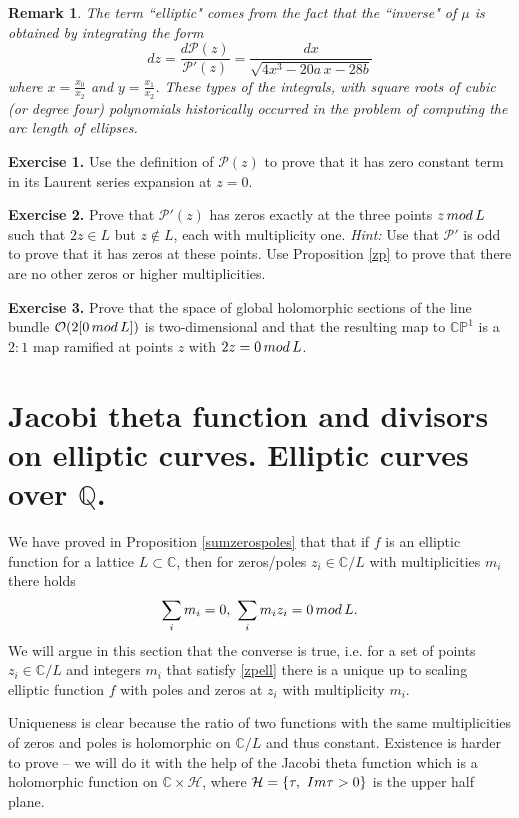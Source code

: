 \documentclass[11pt]{article}
\numberwithin{equation}{section}
\numberwithin{footnote}{section}
\newtheorem{rem}[thm]{Remark}
\newcommand{\blue}{\color{blue}}
\renewcommand{\P}{{\mathbb P}}
\newcommand{\Q}{{\mathbb Q}}
\newcommand{\C}{{\mathbb C}}
\begin{document}
\smallskip
\begin{rem}
The term ``elliptic" comes from the fact that the ``inverse" of $\mu$ is obtained by integrating the form 
$$
dz = \frac  {d\mathcal P(z)}{\mathcal P'(z)} = \frac {dx}{\sqrt{4x^3-20a\,x-28b}}
$$ 
where $x=\frac {x_0}{x_2}$ and $y=\frac{x_1}{x_2}$. These types of the integrals, with square roots of cubic (or degree four) polynomials historically occurred in the problem of computing the arc length of ellipses.
\end{rem}

\smallskip


{\bf Exercise 1.} Use the definition of $\mathcal P(z)$ to prove that it has zero constant term in its Laurent series expansion at $z=0$.

{\bf Exercise 2.} Prove that $\mathcal P'(z)$ has zeros exactly at the three points $z\,{\rm mod}\,L$ such that $2z\in L$ but $z\not\in L$, each with multiplicity one. \emph{Hint:} Use that $\mathcal P'$ is odd to prove that it has zeros at these points. Use Proposition \ref{zp} to prove that there are no other zeros or higher multiplicities.

{\bf Exercise 3.} Prove that the space of global holomorphic sections of the line bundle $\mathcal O(2[0\,{\rm mod}\,L])$  is two-dimensional and that the resulting map to $\C\P^1$ is a $2:1$ map ramified at points $z$ with $2z= 0\,{\rm mod}\, L$.


\section{Jacobi theta function and divisors on elliptic curves. Elliptic curves over $\Q$.}
We have proved in Proposition \ref{sumzerospoles} that that if $f$ is an elliptic function for a lattice $L\subset \C$, then for zeros/poles $z_i\in \C/L$ with multiplicities $m_i$ there holds 
\begin{equation}\label{zpell}
\sum_{i}m_i = 0,~\sum_i m_i z_i =0\,{\rm mod}\,L.
\end{equation}
We will argue in this section that the converse is true, i.e. for a set of points $z_i\in \C/L$ and integers $m_i$ that satisfy \eqref{zpell} there is a unique up to scaling elliptic function $f$ with poles and zeros at $z_i$ with multiplicity $m_i$.

\smallskip
Uniqueness is clear because the ratio of two functions with the same multiplicities of zeros and poles is holomorphic on $\C/L$ and thus constant. Existence is harder to prove -- we will do it with the help of the  {\blue Jacobi theta function} which is a holomorphic function on $\C\times \mathcal H$, where $\mathcal H= \{\tau,{\rm~Im}\tau>0\}$ is the upper half plane.
\end{document}
